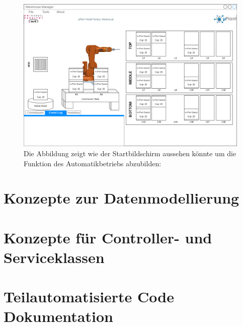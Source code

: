\begin{figure}
        \caption[Mockup des Startbildschirms]
        {\small Die Abbildung zeigt wie der Startbildschirm aussehen könnte um die Funktion des Automatikbetriebs abzubilden:
        }\label{fig:figure11}
        \includegraphics[width = \textwidth ]{Bilder/Mockup_Startbildschirm}
        \centering
\end{figure}


\section{Konzepte zur Datenmodellierung}

\section{Konzepte für Controller- und Serviceklassen}

\section{Teilautomatisierte Code Dokumentation}